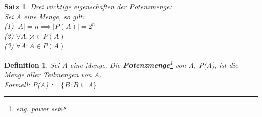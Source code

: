 \documentclass[12pt,german,a4]{article}
\begin{document}
\newtheorem{satz6}[satz]{Satz}
\begin{satz6}
Drei wichtige eigenschaften der Potenzmenge:\\
Sei A eine Menge, so gilt:\\
(1) $|A| = n \implies |P(A)| = 2^{n}$\\
(2) $\forall A: \varnothing \in P(A)$\\
(3) $\forall A: A \in P(A)$
\end{satz6}

\pagebreak

\newtheorem{defPowerSet}[defSet]{Definition}
\begin{defPowerSet}
Sei A eine Menge. Die {\bf Potenzmenge}\footnote{eng. power set} von A, P(A), ist die Menge aller Teilmengen von A.\\
Formell: P(A) := $\{B: B \subseteq A\}$
\end{defPowerSet}
\end{document}
